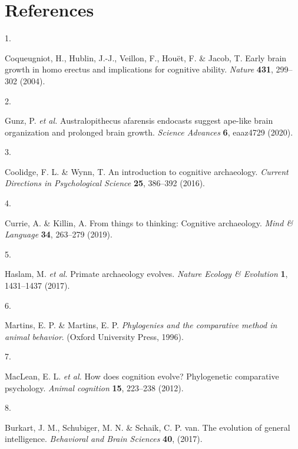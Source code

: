 \documentclass[
  man,floatsintext]{apa6}
\newlength{\cslhangindent}
\newlength{\csllabelwidth}
\newlength{\cslentryspacingunit} %
\newenvironment{CSLReferences}[2] %
 {%
  \setlength{\parindent}{0pt}
  \ifodd #1
  \let\oldpar\par
  \def\par{\hangindent=\cslhangindent\oldpar}
  \fi
  \setlength{\parskip}{#2\cslentryspacingunit}
 }%
 {}
\newcommand{\CSLLeftMargin}[1]{\parbox[t]{\csllabelwidth}{#1}}
\newcommand{\CSLRightInline}[1]{\parbox[t]{\linewidth - \csllabelwidth}{#1}\break}
\begin{document}
\newpage

\hypertarget{references}{%
\section{References}\label{references}}

\begingroup
\setlength{\parindent}{-0.5in}
\setlength{\leftskip}{0.5in}

\hypertarget{refs}{}
\begin{CSLReferences}{0}{0}
\leavevmode{}%
\CSLLeftMargin{1. }%
\CSLRightInline{Coqueugniot, H., Hublin, J.-J., Veillon, F., Houët, F. \& Jacob, T. Early brain growth in homo erectus and implications for cognitive ability. \emph{Nature} \textbf{431}, 299--302 (2004).}

\leavevmode{}%
\CSLLeftMargin{2. }%
\CSLRightInline{Gunz, P. \emph{et al.} Australopithecus afarensis endocasts suggest ape-like brain organization and prolonged brain growth. \emph{Science Advances} \textbf{6}, eaaz4729 (2020).}

\leavevmode{}%
\CSLLeftMargin{3. }%
\CSLRightInline{Coolidge, F. L. \& Wynn, T. An introduction to cognitive archaeology. \emph{Current Directions in Psychological Science} \textbf{25}, 386--392 (2016).}

\leavevmode{}%
\CSLLeftMargin{4. }%
\CSLRightInline{Currie, A. \& Killin, A. From things to thinking: Cognitive archaeology. \emph{Mind \& Language} \textbf{34}, 263--279 (2019).}

\leavevmode{}%
\CSLLeftMargin{5. }%
\CSLRightInline{Haslam, M. \emph{et al.} Primate archaeology evolves. \emph{Nature Ecology \& Evolution} \textbf{1}, 1431--1437 (2017).}

\leavevmode{}%
\CSLLeftMargin{6. }%
\CSLRightInline{Martins, E. P. \& Martins, E. P. \emph{Phylogenies and the comparative method in animal behavior}. (Oxford University Press, 1996).}

\leavevmode{}%
\CSLLeftMargin{7. }%
\CSLRightInline{MacLean, E. L. \emph{et al.} How does cognition evolve? Phylogenetic comparative psychology. \emph{Animal cognition} \textbf{15}, 223--238 (2012).}

\leavevmode{}%
\CSLLeftMargin{8. }%
\CSLRightInline{Burkart, J. M., Schubiger, M. N. \& Schaik, C. P. van. The evolution of general intelligence. \emph{Behavioral and Brain Sciences} \textbf{40}, (2017).}


\end{CSLReferences}
\end{document}
